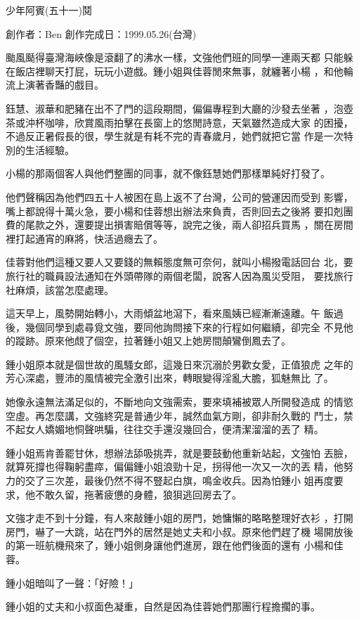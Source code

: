 



少年阿賓(五十一)鬩

創作者：Ben
創作完成日：1999.05.26(台灣)


颱風颳得臺灣海峽像是滾翻了的沸水一樣，文強他們班的同學一連兩天都
只能躲在飯店裡聊天打屁，玩玩小遊戲。鍾小姐與佳蓉閒來無事，就纏著小楊
，和他輪流上演著香豔的戲目。

鈺慧、淑華和肥豬在出不了門的這段期間，偏偏專程到大廳的沙發去坐著
，泡壺茶或沖杯咖啡，欣賞風雨拍擊在長窗上的悠閒詩意，天氣雖然造成大家
的困擾，不過反正暑假長的很，學生就是有耗不完的青春歲月，她們就把它當
作是一次特別的生活經驗。

小楊的那兩個客人與他們整團的同事，就不像鈺慧她們那樣單純好打發了。

他們聲稱因為他們四五十人被困在島上返不了台灣，公司的營運因而受到
影響，嘴上都說得十萬火急，要小楊和佳蓉想出辦法來負責，否則回去之後將
要扣剋團費的尾款之外，還要提出損害賠償等等，說完之後，兩人卻招兵買馬
，關在房間裡打起通宵的麻將，快活過癮去了。

佳蓉對他們這種又要人又要錢的無賴態度無可奈何，就叫小楊撥電話回台
北，要旅行社的職員設法通知在外頭帶隊的兩個老闆，說客人因為風災受阻，
要找旅行社麻煩，該當怎麼處理。

這天早上，風勢開始轉小，大雨傾盆地瀉下，看來風姨已經漸漸遠離。午
飯過後，幾個同學到處尋覓文強，要同他詢問接下來的行程如何繼續，卻完全
不見他的蹤跡。原來他覤了個空，拉著鍾小姐又上她房間顛鸞倒鳳去了。

鍾小姐原本就是個世故的風騷女郎，這幾日來沉溺於男歡女愛，正值狼虎
之年的芳心深處，豐沛的風情被完全激引出來，轉眼變得淫亂大膽，狐魅無比
了。

她像永遠無法滿足似的，不斷地向文強需索，要來填補被眾人所開發造成
的情慾空虛。再怎麼講，文強終究是普通少年，誠然血氣方剛，卻非耐久戰的
鬥士，禁不起女人嬌媚地恫聲哄騙，往往交手還沒幾回合，便清潔溜溜的丟了
精。

鍾小姐焉肯善罷甘休，想辦法舔吸挑弄，就是要鼓動他重新站起，文強怕
丟臉，就算死撐也得鞠躬盡瘁，偏偏鍾小姐浪勁十足，拐得他一次又一次的丟
精，他努力的交了三次差，最後仍然不得不豎起白旗，鳴金收兵。因為怕鍾小
姐再度要求，他不敢久留，拖著疲憊的身體，狼狽逃回房去了。

文強才走不到十分鐘，有人來敲鍾小姐的房門，她慵懶的略略整理好衣衫
，打開房門，嚇了一大跳，站在門外的居然是她丈夫和小叔。原來他們趕了機
場開放後的第一班航機飛來了，鍾小姐側身讓他們進房，跟在他們後面的還有
小楊和佳蓉。

鍾小姐暗叫了一聲：「好險！」

鍾小姐的丈夫和小叔面色凝重，自然是因為佳蓉她們那團行程擔擱的事。

